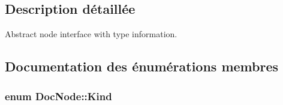 \subsection{Description détaillée}
Abstract node interface with type information. 

\subsection{Documentation des énumérations membres}
\hypertarget{class_doc_node_aebd16e89ca590d84cbd40543ea5faadb}{}
\subsubsection[{Kind}]{\setlength{\rightskip}{0pt plus 5cm}enum {\bf Doc\+Node\+::\+Kind}}\label{class_doc_node_aebd16e89ca590d84cbd40543ea5faadb}
